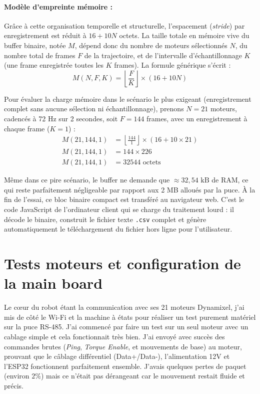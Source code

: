 \documentclass{tropLaClasse}
\begin{document}
\paragraph{Modèle d'empreinte mémoire :}
Grâce à cette organisation temporelle et structurelle, l'espacement (\textit{stride}) par enregistrement est réduit à $16 + 10N$ octets. La taille totale en mémoire vive du buffer binaire, notée $M$, dépend donc du nombre de moteurs sélectionnés $N$, du nombre total de frames $F$ de la trajectoire, et de l'intervalle d'échantillonnage $K$ (une frame enregistrée toutes les $K$ frames). La formule générique s'écrit :
\begin{equation}
M(N, F, K) = \left\lfloor \frac{F}{K} \right\rfloor \times (16 + 10N)
\end{equation}

Pour évaluer la charge mémoire dans le scénario le plus exigeant (enregistrement complet sans aucune sélection ni échantillonnage), prenons $N = 21$ moteurs, cadencés à 72 Hz sur 2 secondes, soit $F = 144$ frames, avec un enregistrement à chaque frame ($K = 1$) :
\begin{align*}
M(21, 144, 1) &= \left\lfloor \frac{144}{1} \right\rfloor \times (16 + 10 \times 21) \\
M(21, 144, 1) &= 144 \times 226 \\
M(21, 144, 1) &= 32544 \text{ octets}
\end{align*}

Même dans ce pire scénario, le buffer ne demande que $\approx 32,54 \text{ kB}$ de RAM, ce qui reste parfaitement négligeable par rapport aux 2 MB alloués par la puce. À la fin de l'essai, ce bloc binaire compact est transféré au navigateur web. C'est le code JavaScript de l'ordinateur client qui se charge du traitement lourd : il décode le binaire, construit le fichier texte \texttt{.csv} complet et génère automatiquement le téléchargement du fichier hors ligne pour l'utilisateur.


\section{Tests moteurs et configuration de la main board}
Le cœur du robot étant la communication avec ses 21 moteurs Dynamixel, j'ai mis de côté le Wi-Fi et la machine à états pour réaliser un test purement matériel sur la puce RS-485. J'ai commencé par faire un test sur un seul moteur avec un cablage simple et cela fonctionnait très bien. J'ai envoyé avec succès des commandes brutes (\textit{Ping}, \textit{Torque Enable}, et mouvements de base) au moteur, prouvant que le câblage différentiel (Data+/Data-), l'alimentation 12V et l'ESP32 fonctionnent parfaitement ensemble. J'avais quelques pertes de paquet (environ $2\%$) mais ce n'était pas dérangeant car le mouvement restait fluide et précis.\\
\end{document}
